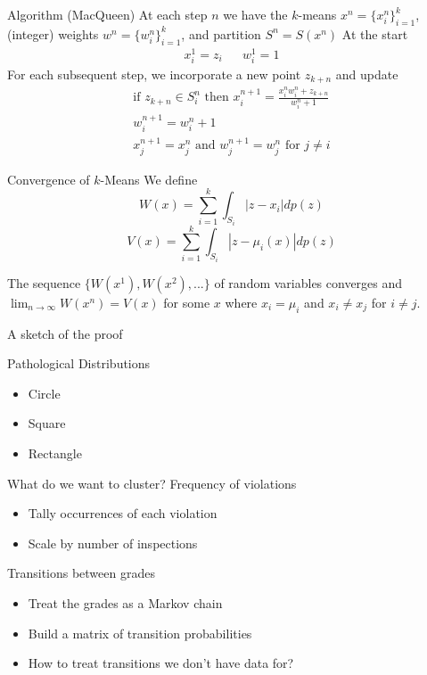 \documentclass[12pt]{beamer}
\begin{document}
\begin{frame}{Algorithm (MacQueen)}
\vfill
At each step $n$ we have the $k$-means $x^n=\{x_i^n\}_{i=1}^k$, (integer) weights
$w^n=\{w_i^n\}_{i=1}^k$, and partition $S^n=S(x^n)$
\vfill
At the start
\begin{align*}
	&x_i^1 = z_i& &w_i^1 = 1&
\end{align*}
\vfill
For each subsequent step, we incorporate a new point $z_{k+n}$ and update
\begin{align*}
	\text{if } z_{k+n} \in S_i^n \text{ then } x_i^{n+1} = 
		\frac{x_i^n w_i^n + z_{k+n}}{w_i^n + 1} \\
	w_i^{n+1} = w_i^n + 1 \\
	x_j^{n+1} = x_j^n \text{ and } w_j^{n+1} = w_j^n \text{ for } j \neq i
\end{align*}
\vfill
\end{frame}

\begin{frame}{Convergence of $k$-Means}
\vfill
We define
\[ W(x) = \sum_{i=1}^k \int_{S_i} |z-x_i| dp(z) \]
\[ V(x) = \sum_{i=1}^k \int_{S_i} |z-\mu_i(x)| dp(z) \]
\vfill
\begin{theorem}
	The sequence $\{ W(x^1), W(x^2), ...\}$ of random variables converges
	and $\lim_{n \to \infty} W(x^n) = V(x)$ for some $x$ where $x_i = \mu_i$
	and $x_i \neq x_j$ for $i \neq j$.
\end{theorem}
\vfill
A sketch of the proof
\vfill
\end{frame}

\begin{frame}{Pathological Distributions}
\begin{itemize}
	\vfill
	\item Circle
	\vfill
	\item Square
	\vfill
	\item Rectangle
	\vfill
\end{itemize}
\end{frame}

\begin{frame}{What do we want to cluster?}
\vfill
Frequency of violations
\begin{itemize}
	\item Tally occurrences of each violation
	\item Scale by number of inspections
\end{itemize}
\vfill
Transitions between grades
\begin{itemize}
	\item Treat the grades as a Markov chain
	\item Build a matrix of transition probabilities
	\item How to treat transitions we don't have data for?
\end{itemize}
\vfill
\end{frame}
\end{document}
